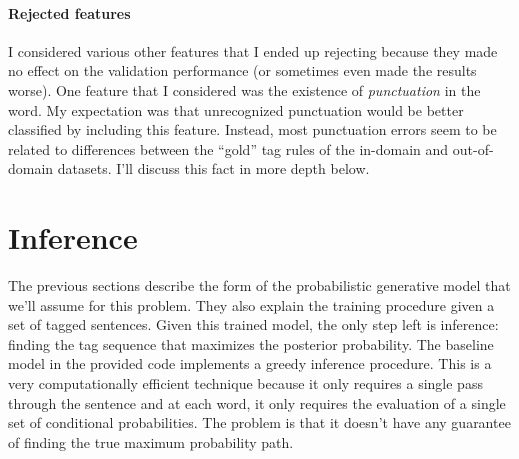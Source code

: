 \documentclass[11pt]{article}
\begin{document}
\paragraph{Rejected features}
I considered various other features that I ended up rejecting because they
made no effect on the validation performance (or sometimes even made the
results worse).
One feature that I considered was the existence of \emph{punctuation} in the
word.
My expectation was that unrecognized punctuation would be better classified by
including this feature.
Instead, most punctuation errors seem to be related to differences between the
``gold'' tag rules of the in-domain and out-of-domain datasets.
I'll discuss this fact in more depth below.

\section{Inference}

The previous sections describe the form of the probabilistic generative model
that we'll assume for this problem.
They also explain the training procedure given a set of tagged sentences.
Given this trained model, the only step left is inference: finding the tag
sequence that maximizes the posterior probability.
The baseline model in the provided code implements a greedy inference
procedure.
This is a very computationally efficient technique because it only requires a
single pass through the sentence and at each word, it only requires the
evaluation of a single set of conditional probabilities.
The problem is that it doesn't have any guarantee of finding the true maximum
probability path.
\end{document}

